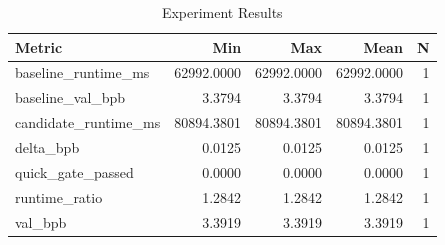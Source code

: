 \begin{table}[h]
\centering
\caption{Experiment Results}
\begin{tabular}{lrrrr}
\hline
Metric & Min & Max & Mean & N \\
\hline
baseline_runtime_ms & 62992.0000 & 62992.0000 & 62992.0000 & 1 \\
baseline_val_bpb & 3.3794 & 3.3794 & 3.3794 & 1 \\
candidate_runtime_ms & 80894.3801 & 80894.3801 & 80894.3801 & 1 \\
delta_bpb & 0.0125 & 0.0125 & 0.0125 & 1 \\
quick_gate_passed & 0.0000 & 0.0000 & 0.0000 & 1 \\
runtime_ratio & 1.2842 & 1.2842 & 1.2842 & 1 \\
val_bpb & 3.3919 & 3.3919 & 3.3919 & 1 \\
\hline
\end{tabular}
\end{table}